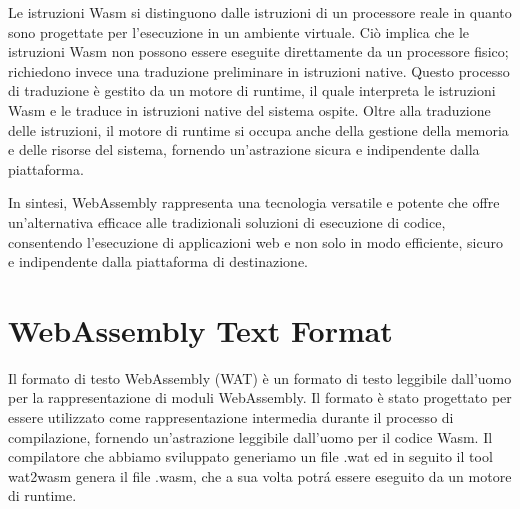 \documentclass[../../main.tex]{subfiles}
\begin{document}
Le istruzioni Wasm si distinguono dalle istruzioni di un processore reale in quanto sono progettate per l'esecuzione in un ambiente virtuale. Ciò implica che le istruzioni Wasm non possono essere eseguite direttamente da un processore fisico; richiedono invece una traduzione preliminare in istruzioni native. Questo processo di traduzione è gestito da un motore di runtime, il quale interpreta le istruzioni Wasm e le traduce in istruzioni native del sistema ospite. Oltre alla traduzione delle istruzioni, il motore di runtime si occupa anche della gestione della memoria e delle risorse del sistema, fornendo un'astrazione sicura e indipendente dalla piattaforma.

In sintesi, WebAssembly rappresenta una tecnologia versatile e potente che offre un'alternativa efficace alle tradizionali soluzioni di esecuzione di codice, consentendo l'esecuzione di applicazioni web e non solo in modo efficiente, sicuro e indipendente dalla piattaforma di destinazione.\cite{WebAssemblyDoc}

\section{WebAssembly Text Format}
Il formato di testo WebAssembly (WAT) \cite{WebAssemblyTextFormat} è un formato di testo leggibile dall'uomo per la rappresentazione di moduli WebAssembly. Il formato è stato progettato per essere utilizzato come rappresentazione intermedia durante il processo di compilazione, fornendo un'astrazione leggibile dall'uomo per il codice Wasm.
Il compilatore che abbiamo sviluppato generiamo un file .wat ed in seguito il tool wat2wasm \cite{jain2022webassembly} genera il file .wasm, che a sua volta potrá essere eseguito da un motore di runtime.
\end{document}
